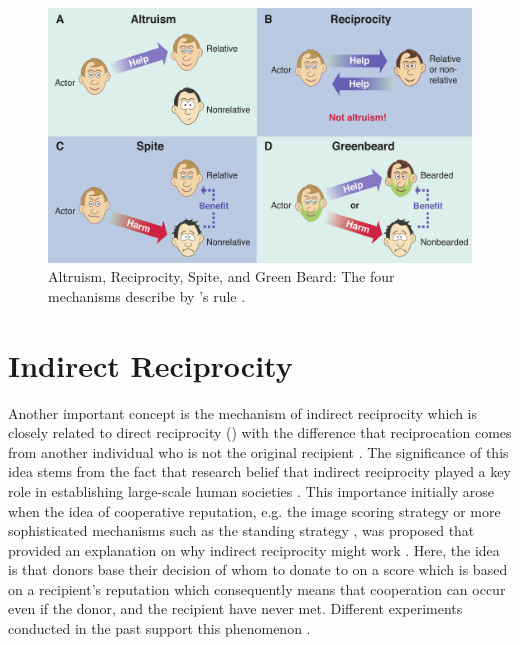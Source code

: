 \documentclass[sigconf]{acmart}
\begin{document}
    \cite{west_altruism_2010}
    \cite{bala_green_2017}
    \cite{nowak_five_2006}

    \begin{figure}
        \includegraphics[width=\columnwidth]{figures/mechanisms}
        \caption{Altruism, Reciprocity, Spite, and Green Beard: The four mechanisms describe by \citeauthor{hamilton_kin_1964}'s rule \cite{west_altruism_2010}.}
        \label{fig:mechanisms}
    \end{figure}


    \section{Indirect Reciprocity}
    Another important concept is the mechanism of indirect reciprocity which is closely related to direct reciprocity () with the difference that reciprocation comes from another individual who is not the original recipient \cite{alexander_biology_1987,boyd_evolution_1989}.
    The significance of this idea stems from the fact that research belief that indirect reciprocity played a key role in establishing large-scale human societies \cite{roberts_kin_2019}.
    This importance initially arose when the idea of cooperative reputation, e.g. the image scoring strategy or more sophisticated mechanisms such as the standing strategy \cite{leimar_evolution_2001,ohtsuki_leading_2006}, was proposed that provided an explanation on why indirect reciprocity might work \cite{nowak_evolution_1998}.
    Here, the idea is that donors base their decision of whom to donate to on a score which is based on a recipient's reputation which consequently means that cooperation can occur even if the donor, and the recipient have never met.
    Different experiments conducted in the past support this phenomenon \cite{milinski_cooperation_2002, milinski_reputation_2002,milinski_reputation_2016}.
\end{document}
